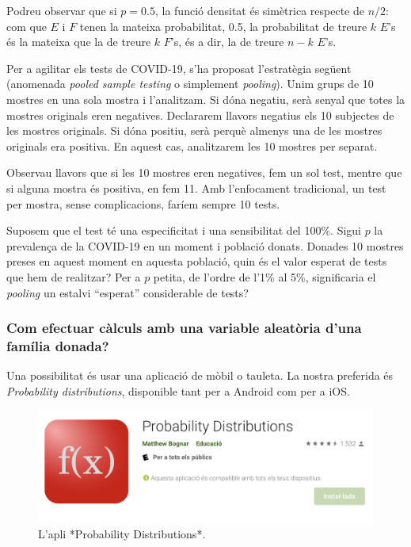 \documentclass[
]{book}
\theoremstyle{definition}
\theoremstyle{definition}
\theoremstyle{definition}
\theoremstyle{remark}
\begin{document}
Podreu observar que si \(p=0.5\), la funció densitat és simètrica respecte de \(n/2\): com que \(E\) i \(F\) tenen la mateixa probabilitat, 0.5, la probabilitat de treure \(k\) \(E\)'s és la mateixa que la de treure \(k\) \(F\)'s, és a dir, la de treure \(n-k\) \(E\)'s.

\begin{rmdexercici}
Per a agilitar els tests de COVID-19, s'ha proposat l'estratègia següent (anomenada \emph{pooled sample testing} o simplement \emph{pooling}). Unim grups de 10 mostres en una sola mostra i l'analitzam. Si dóna negatiu, serà senyal que totes la mostres originals eren negatives. Declararem llavors negatius els 10 subjectes de les mostres originals. Si dóna positiu, serà perquè almenys una de les mostres originals era positiva. En aquest cas, analitzarem les 10 mostres per separat.

Observau llavors que si les 10 mostres eren negatives, fem un sol test, mentre que si alguna mostra és positiva, en fem 11. Amb l'enfocament tradicional, un test per mostra, sense complicacions, faríem sempre 10 tests.

Suposem que el test té una especificitat i una sensibilitat del 100\%. Sigui \(p\) la prevalença de la COVID-19 en un moment i població donats. Donades 10 mostres preses en aquest moment en aquesta població, quin és el valor esperat de tests que hem de realitzar? Per a \(p\) petita, de l'ordre de l'1\% al 5\%, significaria el \emph{pooling} un estalvi ``esperat'' considerable de tests?
\end{rmdexercici}

\hypertarget{com-efectuar-cuxe0lculs-amb-una-variable-aleatuxf2ria-duna-famuxedlia-donada}{%
\subsubsection*{Com efectuar càlculs amb una variable aleatòria d'una família donada?}\label{com-efectuar-cuxe0lculs-amb-una-variable-aleatuxf2ria-duna-famuxedlia-donada}}

Una possibilitat és usar una aplicació de mòbil o tauleta. La nostra preferida és \emph{Probability distributions}, disponible tant per a Android com per a iOS.

\begin{figure}

{\centering \includegraphics[width=0.8\linewidth]{Bioestadistica-II_files/figure-html/appprobdistr} 

}

\caption{L'apli *Probability Distributions*.}\label{fig:unnamed-chunk-38}
\end{figure}
\end{document}
